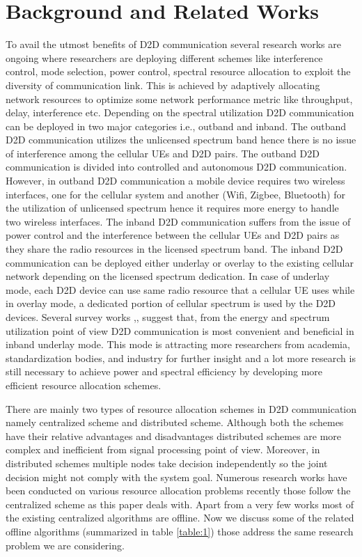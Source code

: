 \documentclass[times]{dacauth}
\begin{document}
\section{Background and Related Works}\label{section:Related Work}


\smallskip
\noindent
To avail the utmost benefits of D2D communication several research works are ongoing where researchers are deploying different schemes like interference control, mode selection, power control, spectral resource allocation to exploit the diversity of communication link. This is achieved by adaptively allocating network resources to optimize some network performance metric like throughput, delay, interference etc. Depending on the spectral utilization D2D communication can be deployed in two major categories i.e., outband and inband. The outband D2D communication utilizes the unlicensed spectrum band hence there is no issue of interference among the cellular UEs and D2D pairs. The outband D2D communication is divided into controlled and autonomous D2D communication. However, in outband D2D communication a mobile device requires two wireless interfaces, one for the cellular system and another (Wifi, Zigbee, Bluetooth) for the utilization of unlicensed spectrum hence it requires more energy to handle two wireless interfaces. The inband D2D communication suffers from the issue of power control and the interference between the cellular UEs and D2D pairs as they share the radio resources in the licensed spectrum band. The inband D2D communication can be deployed either underlay or overlay to the existing cellular network depending on the licensed spectrum dedication. In case of underlay mode, each D2D device can use same radio resource that a cellular UE uses while in overlay mode, a dedicated portion of cellular spectrum is used by the D2D devices. Several survey works \cite{ali2016},\cite{alkurd2014survey},\cite{asadi2014survey} suggest that, from the energy and spectrum utilization point of view D2D communication is most convenient and beneficial in inband underlay mode. This mode is attracting more researchers from academia, standardization bodies, and industry for further insight and a lot more research is still necessary to achieve power and spectral efficiency by developing more efficient resource allocation schemes. 

\noindent
There are mainly two types of resource allocation schemes in D2D communication namely centralized scheme and distributed scheme. Although both the schemes have their relative advantages and disadvantages distributed schemes are more complex and inefficient from signal processing point of view. Moreover, in distributed schemes multiple nodes take decision independently so the joint decision might not comply with the system goal. Numerous research works have been conducted on various resource allocation problems recently those follow the centralized scheme as this paper deals with. Apart from a very few works most of the existing centralized algorithms are offline. Now we discuss some of the related offline algorithms (summarized in table \ref{table:1}) those address the same research problem we are considering.
\end{document}
